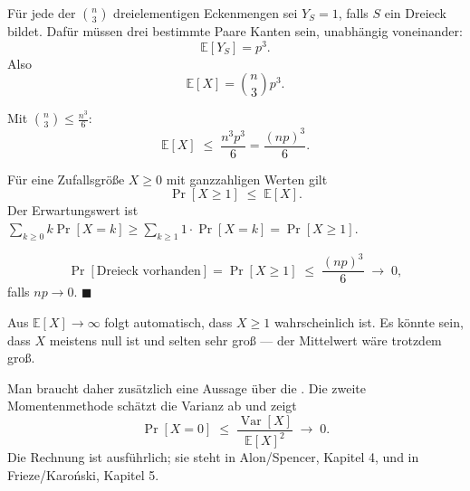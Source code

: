 \begin{merksatz}
Für jede der $\binom{n}{3}$ dreielementigen Eckenmengen sei $Y_S = 1$, falls $S$ ein Dreieck bildet. Dafür müssen drei bestimmte Paare Kanten sein, unabhängig voneinander:
\[ \mathbb{E}[Y_S] = p^3 . \]
Also
\[ \mathbb{E}[X] = \binom{n}{3} p^3 . \]

Mit $\binom{n}{3} \le \frac{n^3}{6}$:
\[ \mathbb{E}[X] \;\le\; \frac{n^3 p^3}{6} = \frac{(np)^3}{6} . \]

Für eine Zufallsgröße $X \ge 0$ mit ganzzahligen Werten gilt
\[ \Pr[X \ge 1] \;\le\; \mathbb{E}[X] . \]
 Der Erwartungswert ist $\sum_{k\ge 0} k \Pr[X=k] \ge \sum_{k \ge 1} 1 \cdot \Pr[X=k] = \Pr[X \ge 1]$.

\[ \Pr[\text{Dreieck vorhanden}] = \Pr[X \ge 1] \;\le\; \frac{(np)^3}{6} \;\longrightarrow\; 0, \]
falls $np \to 0$. $\blacksquare$
\end{merksatz}

\begin{merksatz}
Aus $\mathbb{E}[X] \to \infty$ folgt  automatisch, dass $X \ge 1$ wahrscheinlich ist. Es könnte sein, dass $X$ meistens null ist und selten sehr groß --- der Mittelwert wäre trotzdem groß.

\begin{center}
\begin{minipage}{0.88\textwidth}
\end{minipage}
\end{center}

Man braucht daher zusätzlich eine Aussage über die . Die zweite Momentenmethode schätzt die Varianz ab und zeigt
\[ \Pr[X = 0] \;\le\; \frac{\operatorname{Var}[X]}{\mathbb{E}[X]^2} \;\longrightarrow\; 0 . \]
Die Rechnung ist ausführlich; sie steht in Alon/Spencer, Kapitel 4, und in Frieze/Karoński, Kapitel 5.
\end{merksatz}

